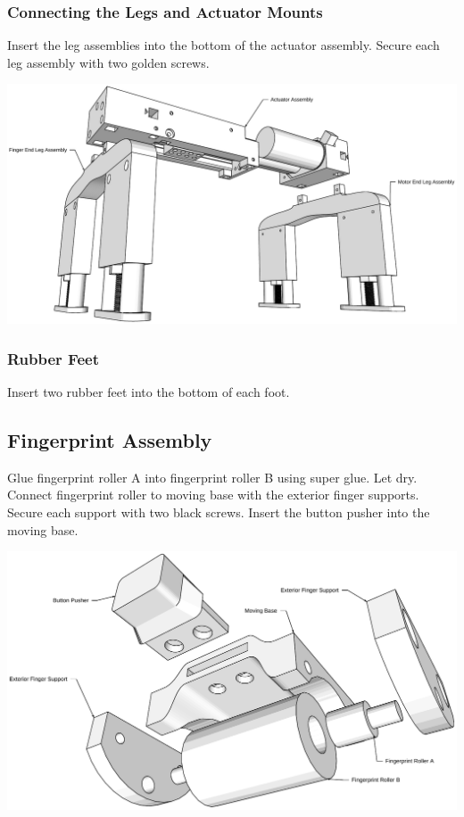 \documentclass[letterpaper,10pt,english]{sphinxmanual}
\begin{document}
\subsubsection{Connecting the Legs and Actuator Mounts}
\label{NARFSTR:connecting-the-legs-and-actuator-mounts}
Insert the leg assemblies into the bottom of the actuator assembly. Secure each leg assembly with two golden screws.

\includegraphics{LegAttachment.pdf}


\subsubsection{Rubber Feet}
\label{NARFSTR:rubber-feet}
Insert two rubber feet into the bottom of each foot.


\subsection{Fingerprint Assembly}
\label{NARFSTR:id1}
Glue fingerprint roller A into fingerprint roller B using super glue. Let dry. Connect fingerprint roller to moving base with the exterior finger supports. Secure each support with two black screws. Insert the button pusher into the moving base.

\includegraphics{FingerprintAssemblyConstruction.pdf}
\end{document}
